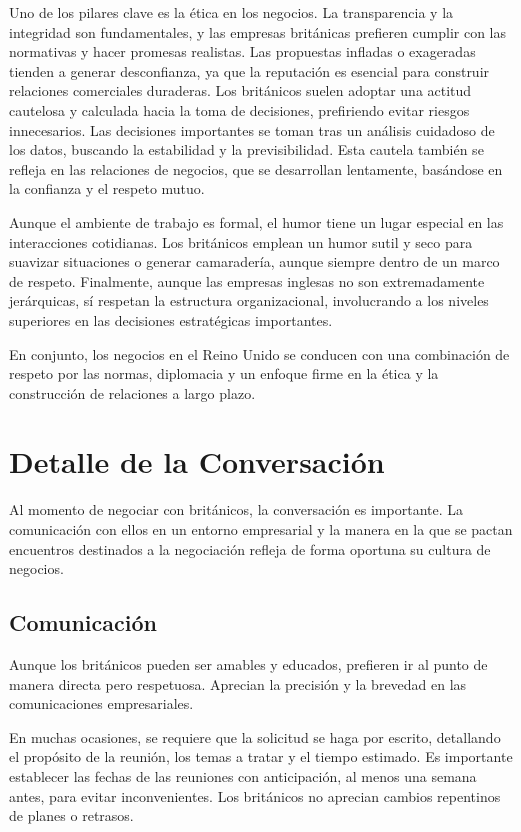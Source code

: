\documentclass[letterpaper, 12pt]{article}
\begin{document}
Uno de los pilares clave es la ética en los negocios. La transparencia y la
integridad son fundamentales, y las empresas británicas prefieren cumplir con
las normativas y hacer promesas realistas. Las propuestas infladas o exageradas
tienden a generar desconfianza, ya que la reputación es esencial para construir
relaciones comerciales duraderas. Los británicos suelen adoptar una actitud
cautelosa y calculada hacia la toma de decisiones, prefiriendo evitar riesgos
innecesarios. Las decisiones importantes se toman tras un análisis cuidadoso de
los datos, buscando la estabilidad y la previsibilidad. Esta cautela también se
refleja en las relaciones de negocios, que se desarrollan lentamente, basándose
en la confianza y el respeto mutuo.

Aunque el ambiente de trabajo es formal, el humor tiene un lugar especial en
las interacciones cotidianas. Los británicos emplean un humor sutil y seco para
suavizar situaciones o generar camaradería, aunque siempre dentro de un marco
de respeto. Finalmente, aunque las empresas inglesas no son extremadamente
jerárquicas, sí respetan la estructura organizacional, involucrando a los
niveles superiores en las decisiones estratégicas importantes.

En conjunto, los negocios en el Reino Unido se conducen con una combinación de
respeto por las normas, diplomacia y un enfoque firme en la ética y la
construcción de relaciones a largo plazo.

\section*{Detalle de la Conversación}

Al momento de negociar con británicos, la conversación es importante. La
comunicación con ellos en un entorno empresarial y la manera en la que se
pactan encuentros destinados a la negociación refleja de forma oportuna su
cultura de negocios.

\subsection*{Comunicación}

Aunque los británicos pueden ser amables y educados, prefieren ir al punto de
manera directa pero respetuosa. Aprecian la precisión y la brevedad en las
comunicaciones empresariales.

En muchas ocasiones, se requiere que la solicitud se haga por escrito,
detallando el propósito de la reunión, los temas a tratar y el tiempo estimado.
Es importante establecer las fechas de las reuniones con anticipación, al menos
una semana antes, para evitar inconvenientes. Los británicos no aprecian
cambios repentinos de planes o retrasos.
\end{document}
